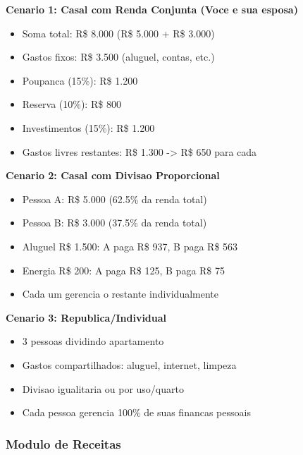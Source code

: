 \textbf{Cenario 1: Casal com Renda Conjunta (Voce e sua esposa)}
\begin{itemize}
    \item Soma total: R\$ 8.000 (R\$ 5.000 + R\$ 3.000)
    \item Gastos fixos: R\$ 3.500 (aluguel, contas, etc.)
    \item Poupanca (15\%): R\$ 1.200
    \item Reserva (10\%): R\$ 800
    \item Investimentos (15\%): R\$ 1.200
    \item Gastos livres restantes: R\$ 1.300 -> R\$ 650 para cada
\end{itemize}

\textbf{Cenario 2: Casal com Divisao Proporcional}
\begin{itemize}
    \item Pessoa A: R\$ 5.000 (62.5\% da renda total)
    \item Pessoa B: R\$ 3.000 (37.5\% da renda total)
    \item Aluguel R\$ 1.500: A paga R\$ 937, B paga R\$ 563
    \item Energia R\$ 200: A paga R\$ 125, B paga R\$ 75
    \item Cada um gerencia o restante individualmente
\end{itemize}

\textbf{Cenario 3: Republica/Individual}
\begin{itemize}
    \item 3 pessoas dividindo apartamento
    \item Gastos compartilhados: aluguel, internet, limpeza
    \item Divisao igualitaria ou por uso/quarto
    \item Cada pessoa gerencia 100\% de suas financas pessoais
\end{itemize}

\subsubsection{Modulo de Receitas}

